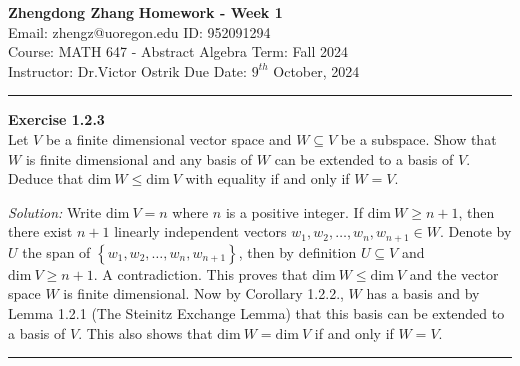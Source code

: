 \documentclass[a4paper, 11pt]{article}
\newenvironment{problem}[2][Exercise]
    { \begin{mdframed}[backgroundcolor=gray!20] \textbf{#1 #2} \\}
    {  \end{mdframed}}
\newenvironment{solution}
    {\textit{Solution:}}
    {}
\begin{document}
\noindent
\large\textbf{Zhengdong Zhang} \hfill \textbf{Homework - Week 1}   \\
Email: zhengz@uoregon.edu \hfill ID: 952091294 \\
\normalsize Course: MATH 647 - Abstract Algebra  \hfill Term: Fall 2024\\
Instructor: Dr.Victor Ostrik \hfill Due Date: $9^{th}$ October, 2024 \\
\noindent\rule{7in}{2.8pt}
\begin{problem}{1.2.3}
Let \(V\) be a finite dimensional vector space and \(W\subseteq V\) be a subspace. Show that \(W\) is finite dimensional and any basis of \(W\) can be extended to a basis of \(V\). Deduce that \(\text{dim}\ W\leq \text{dim}\ V\) with equality if and only if \(W=V\).
\end{problem}
\begin{solution}
Write \(\text{dim}\ V=n\) where \(n\) is a positive integer. If \(\text{dim}\ W\geq n+1\), then there exist \(n+1\) linearly independent vectors \(w_1,w_2,\ldots,w_n,w_{n+1}\in W\). Denote by \(U\) the span of \(\left\{w_1,w_2,\ldots,w_n,w_{n+1}\right\}\), then by definition \(U\subseteq V\) and  \(\text{dim}\ V\geq n+1\). A contradiction. This proves that \(\text{dim}\ W\leq \text{dim}\ V\) and the vector space \(W\) is finite dimensional. Now by Corollary 1.2.2., \(W\) has a basis and by Lemma 1.2.1 (The Steinitz Exchange Lemma) that this basis can be extended to a basis of \(V\). This also shows that \(\text{dim}\ W=\text{dim}\ V\) if and only if \(W=V\).
\end{solution} 

\noindent\rule{7in}{2.8pt}

\end{document}
